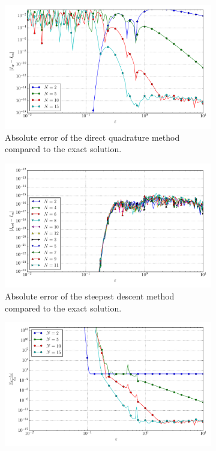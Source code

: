 \documentclass[a4paper,10pt]{article}
\begin{document}
\begin{figure}[ht!]
\begin{subfigure}[t]{0.5\linewidth}
    \includegraphics[width=\linewidth]{./plots/tp_4d_conv_eps_(2,1,2,1)_(1,1,1,1)_err_qr.pdf}
    \caption{Absolute error of the direct quadrature method compared to the exact solution.}
    \label{fig:tp_4d_conv_eps_2121_1111_err_qr}
  \end{subfigure}
  \begin{subfigure}[t]{0.5\linewidth}
    \includegraphics[width=\linewidth]{./plots/tp_4d_conv_eps_(2,1,2,1)_(1,1,1,1)_err_nsd.pdf}
    \caption{Absolute error of the steepest descent method compared to the exact solution.}
    \label{fig:tp_4d_conv_eps_2121_1111_err_nsd}
  \end{subfigure}
  \begin{subfigure}[t]{0.5\linewidth}
    \includegraphics[width=\linewidth]{./plots/tp_4d_conv_eps_(2,1,2,1)_(1,1,1,1)_err_rel_qr.pdf}

\end{subfigure}
\end{figure}
\end{document}
